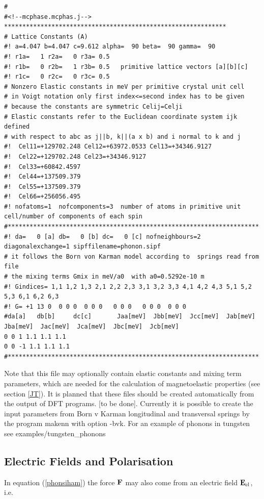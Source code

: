 \begin{verbatim}
# 
#<!--mcphase.mcphas.j-->
*************************************************************
# Lattice Constants (A)
#! a=4.047 b=4.047 c=9.612 alpha=  90 beta=  90 gamma=  90
#! r1a=   1 r2a=   0 r3a= 0.5
#! r1b=   0 r2b=   1 r3b= 0.5   primitive lattice vectors [a][b][c]
#! r1c=   0 r2c=   0 r3c= 0.5
# Nonzero Elastic constants in meV per primitive crystal unit cell 
# in Voigt notation only first index<=second index has to be given
# because the constants are symmetric Celij=Celji
# Elastic constants refer to the Euclidean coordinate system ijk defined
# with respect to abc as j||b, k||(a x b) and i normal to k and j
#!  Cel11=+129702.248 Cel12=+63972.0533 Cel13=+34346.9127
#!  Cel22=+129702.248 Cel23=+34346.9127
#!  Cel33=+60842.4597
#!  Cel44=+137509.379
#!  Cel55=+137509.379
#!  Cel66=+256056.495
#! nofatoms=1  nofcomponents=3  number of atoms in primitive unit cell/number of components of each spin
#*********************************************************************
#! da=   0 [a] db=   0 [b] dc=   0 [c] nofneighbours=2 diagonalexchange=1 sipffilename=phonon.sipf
# it follows the Born von Karman model according to  springs read from file 
# the mixing terms Gmix in meV/a0  with a0=0.5292e-10 m
#! Gindices= 1,1 1,2 1,3 2,1 2,2 2,3 3,1 3,2 3,3 4,1 4,2 4,3 5,1 5,2 5,3 6,1 6,2 6,3
#! G= +1 13 0  0 0 0  0 0 0   0 0 0   0 0 0  0 0 0
#da[a]   db[b]     dc[c]       Jaa[meV]  Jbb[meV]  Jcc[meV]  Jab[meV]  Jba[meV]  Jac[meV]  Jca[meV]  Jbc[meV]  Jcb[meV]
0 0 1 1.1 1.1 1.1
0 0 -1 1.1 1.1 1.1 
#*********************************************************************
\end{verbatim}

Note that this file may optionally contain elastic constants and mixing
term parameters, which are needed for the calculation
of magnetoelastic properties (see section \ref{JT}).
It is planned that these files should be created automatically from the 
output of DFT programs. [to be done]. Currently it is possible to create 
the input parameters from Born v Karman longitudinal and transversal springs
by the program {\prg makenn} with option {\prg -bvk}.
For an example of phonons in tungsten see {\prg examples/tungsten\_phonons }

\subsection{Electric Fields and Polarisation}

In equation (\ref{phonsiham}) the force $\mathbf F$ may also come from an
electric field $\mathbf E_{\rm el}$, i.e.

